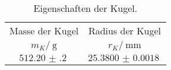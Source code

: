 \begin{table}[H]
	\centering
	\begin{tabular}{cc}
		\toprule
		{Masse der Kugel} & {Radius der Kugel} \\
		{$m_K/\:\si{\gram}$} & {$r_K/\:\si{\milli\meter}$}\\
		\midrule
			$\SI{512.20(20)}{}$& $\SI{25.3800(18)}{}$\\
		\bottomrule
	\end{tabular}
	\caption{Eigenschaften der Kugel.}
	\label{tab:kugel}
\end{table}